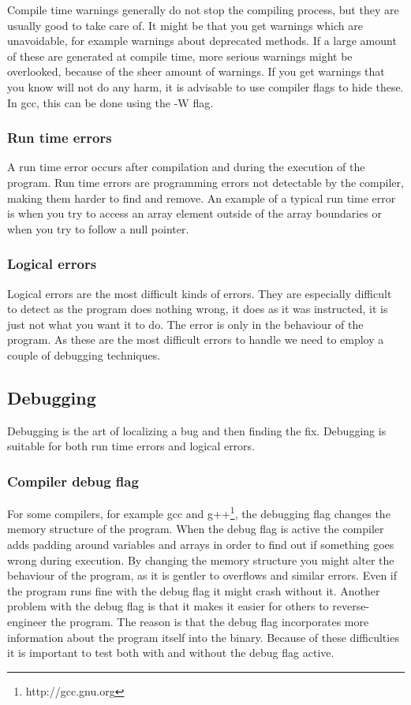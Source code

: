\documentclass[11pt,a4paper,twoside]{article}
\begin{document}
Compile time warnings generally do not stop the compiling process, but they are
usually good to take care of. It might be that you get warnings which are
unavoidable, for example warnings about deprecated methods. If a large amount
of these are generated at compile time, more serious warnings might be
overlooked, because of the sheer amount of warnings. If you get warnings that
you know will not do any harm, it is advisable to use compiler flags to hide
these. In gcc, this can be done using the -W flag.

\subsubsection{Run time errors}

A run time error occurs after compilation and during the execution of the
program. Run time errors are programming errors not detectable by the compiler,
making them harder to find and remove. An example of a typical run time error
is when you try to access an array element outside of the array boundaries or
when you try to follow a null pointer.

\subsubsection{Logical errors}

Logical errors are the most difficult kinds of errors. They are especially
difficult to detect as the program does nothing wrong, it does as it was
instructed, it is just not what you want it to do. The error is only in the
behaviour of the program. As these are the most difficult errors to handle we
need to employ a couple of debugging techniques.

\subsection{Debugging}

Debugging is the art of localizing a bug and then finding the fix. Debugging is
suitable for both run time errors and logical errors. 

\subsubsection{Compiler debug flag}

For some compilers, for example gcc and g++\footnote{http://gcc.gnu.org}, the
debugging flag changes the memory structure of the program. When the debug flag
is active the compiler adds padding around variables and arrays in order to
find out if something goes wrong during execution. By changing the memory
structure you might alter the behaviour of the program, as it is gentler to
overflows and similar errors.  Even if the program runs fine with the debug
flag it might crash without it.  Another problem with the debug flag is that it
makes it easier for others to reverse-engineer the program. The reason is that
the debug flag incorporates more information about the program itself into the
binary. Because of these difficulties it is important to test both with and
without the debug flag active.
\end{document}
